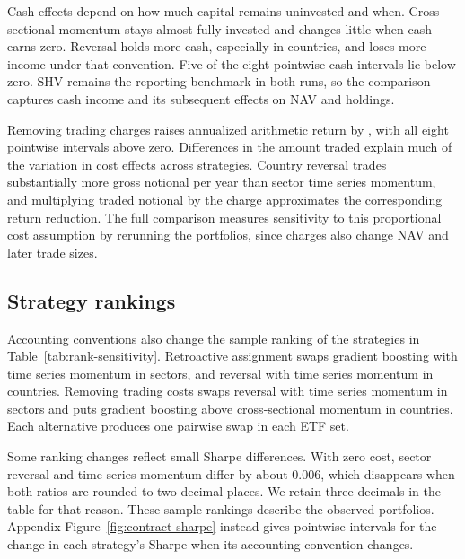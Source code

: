 \documentclass{article}
\begin{document}
Cash effects depend on how much capital remains uninvested and when. Cross-sectional momentum stays almost fully invested and changes little when cash earns zero. Reversal holds more cash, especially in countries, and loses more income under that convention. Five of the eight pointwise cash intervals lie below zero. SHV remains the reporting benchmark in both runs, so the comparison captures cash income and its subsequent effects on NAV and holdings.

Removing trading charges raises annualized arithmetic return by \ExpansionCostEffectRange{}, with all eight pointwise intervals above zero. Differences in the amount traded explain much of the variation in cost effects across strategies. Country reversal trades substantially more gross notional per year than sector time series momentum, and multiplying traded notional by the charge approximates the corresponding return reduction. The full comparison measures sensitivity to this proportional cost assumption by rerunning the portfolios, since charges also change NAV and later trade sizes.



\subsection{Strategy rankings}

Accounting conventions also change the sample ranking of the strategies in Table~\ref{tab:rank-sensitivity}. Retroactive assignment swaps gradient boosting with time series momentum in sectors, and reversal with time series momentum in countries. Removing trading costs swaps reversal with time series momentum in sectors and puts gradient boosting above cross-sectional momentum in countries. Each alternative produces one pairwise swap in each ETF set.

Some ranking changes reflect small Sharpe differences. With zero cost, sector reversal and time series momentum differ by about 0.006, which disappears when both ratios are rounded to two decimal places. We retain three decimals in the table for that reason. These sample rankings describe the observed portfolios. Appendix Figure~\ref{fig:contract-sharpe} instead gives pointwise intervals for the change in each strategy's Sharpe when its accounting convention changes.
\end{document}
